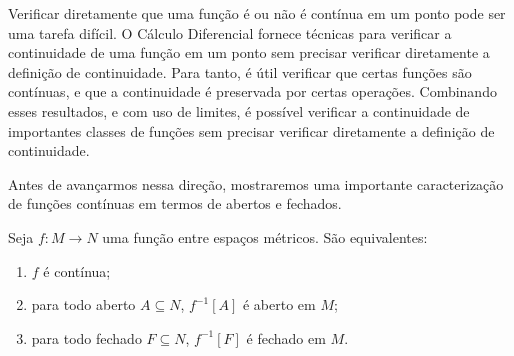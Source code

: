 Verificar diretamente que uma função é ou não é contínua em um ponto pode ser uma tarefa difícil.
O Cálculo Diferencial fornece técnicas para verificar a continuidade de uma função em um ponto sem precisar verificar diretamente a definição de continuidade.
Para tanto, é útil verificar que certas funções são contínuas, e que a continuidade é preservada por certas operações.
Combinando esses resultados, e com uso de limites, é possível verificar a continuidade de importantes classes de funções sem precisar verificar diretamente a definição de continuidade.

Antes de avançarmos nessa direção, mostraremos uma importante caracterização de funções contínuas em termos de abertos e fechados.

\begin{proposition}
    Seja $f: M \to N$ uma função entre espaços métricos.
    São equivalentes:

    \begin{enumerate}[label=(\roman*)]
        \item $f$ é contínua;
        \item para todo aberto $A\subseteq N$, $f^{-1}[A]$ é aberto em $M$;
        \item para todo fechado $F\subseteq N$, $f^{-1}[F]$ é fechado em $M$.
    \end{enumerate}
\end{proposition}
